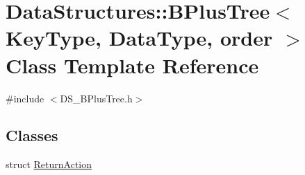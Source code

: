 \hypertarget{class_data_structures_1_1_b_plus_tree}{\section{Data\-Structures\-:\-:B\-Plus\-Tree$<$ Key\-Type, Data\-Type, order $>$ Class Template Reference}
\label{class_data_structures_1_1_b_plus_tree}
}


{\ttfamily \#include $<$D\-S\-\_\-\-B\-Plus\-Tree.\-h$>$}

\subsection*{Classes}
\begin{DoxyCompactItemize}
\item 
struct \hyperlink{struct_data_structures_1_1_b_plus_tree_1_1_return_action}{Return\-Action}
\end{DoxyCompactItemize}
